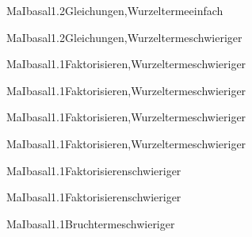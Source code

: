 \documentclass[12pt]{article}
\begin{document}
\begin{Add}{MaI}{basal1.2}{Gleichungen,Wurzelterme}{einfach}
\end{Add}

\begin{Add}{MaI}{basal1.2}{Gleichungen,Wurzelterme}{schwieriger}
\end{Add}

\begin{Add}{MaI}{basal1.1}{Faktorisieren,Wurzelterme}{schwieriger}
\end{Add}

\begin{Add}{MaI}{basal1.1}{Faktorisieren,Wurzelterme}{schwieriger}
\end{Add}

\begin{Add}{MaI}{basal1.1}{Faktorisieren,Wurzelterme}{schwieriger}
\end{Add}
\begin{Add}{MaI}{basal1.1}{Faktorisieren,Wurzelterme}{schwieriger}
\end{Add}

\begin{Add}{MaI}{basal1.1}{Faktorisieren}{schwieriger}
\end{Add}

\begin{Add}{MaI}{basal1.1}{Faktorisieren}{schwieriger}
\end{Add}

\begin{Add}{MaI}{basal1.1}{Bruchterme}{schwieriger}
\end{Add}
\end{document}
